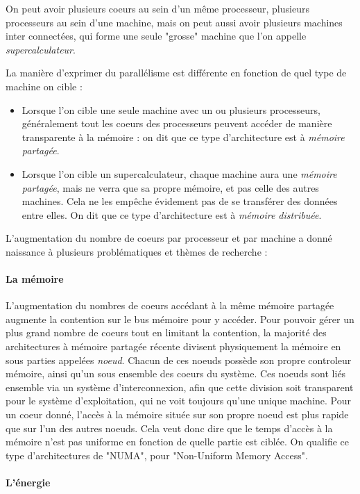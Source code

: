 On peut avoir plusieurs coeurs au sein d'un même processeur, plusieurs processeurs au sein d'une machine, mais on peut aussi avoir plusieurs machines inter connectées, qui forme une seule "grosse" machine que l'on appelle \emph{supercalculateur}.

La manière d'exprimer du parallélisme est différente en fonction de quel type de machine on cible :
\begin{itemize}
  \item Lorsque l'on cible une seule machine avec un ou plusieurs processeurs, généralement tout les coeurs des processeurs peuvent accéder de manière transparente à la mémoire : on dit que ce type d'architecture est à \emph{mémoire partagée}.
  \item Lorsque l'on cible un supercalculateur, chaque machine aura une \emph{mémoire partagée}, mais ne verra que sa propre mémoire, et pas celle des autres machines. Cela ne les empêche évidement pas de se transférer des données entre elles. On dit que ce type d'architecture est à \emph{mémoire distribuée}.
\end{itemize}

L'augmentation du nombre de coeurs par processeur et par machine a donné naissance à plusieurs problématiques et thèmes de recherche :

\paragraph{La mémoire}
L'augmentation du nombres de coeurs accédant à la même mémoire partagée augmente la contention sur le bus mémoire pour y accéder.
Pour pouvoir gérer un plus grand nombre de coeurs tout en limitant la contention, la majorité des architectures à mémoire partagée récente divisent physiquement la mémoire en sous parties appelées \emph{noeud}.
Chacun de ces noeuds possède son propre controleur mémoire, ainsi qu'un sous ensemble des coeurs du système.
Ces noeuds sont liés ensemble via un système d'interconnexion, afin que cette division soit transparent pour le système d'exploitation, qui ne voit toujours qu'une unique machine.
Pour un coeur donné, l'accès à la mémoire située sur son propre noeud est plus rapide que sur l'un des autres noeuds. Cela veut donc dire que le temps d'accès à la mémoire n'est pas uniforme en fonction de quelle partie est ciblée.
On qualifie ce type d'architectures de "NUMA", pour "Non-Uniform Memory Access".

\paragraph{L'énergie}

